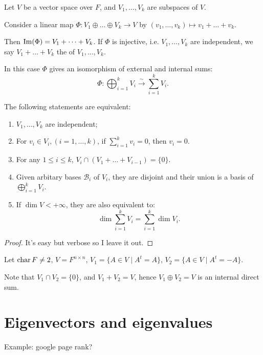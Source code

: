 \begin{remark}
    Let $V$ be a vector space over $F$, and $V_1,\dots,V_k$ are subspaces of $V$.

	Consider a linear map  $\Phi: V_1\oplus \dots\oplus V_k\to V$ by
	$(v_1,\dots,v_k)\mapsto v_1+\dots+v_k$.

	Then $\operatorname{Im}(\Phi) = V_1+\dots+V_k$.
	If $\Phi$ is injective, i.e.  $V_1,\dots,V_k$ are independent, we say
	$V_1+\dots+V_k$ the  of  $V_1,\dots,V_k$.

	In this case $\Phi$ gives an isomorphism of external and internal sums:
	\[
		\Phi: \bigoplus_{i=1}^k V_i \xrightarrow{\sim} \sum_{i=1}^k V_i.
	\]
\end{remark}

\begin{lemma}
	The following statements are equivalent:
	\begin{enumerate}
		\item $V_1,\dots, V_k$ are independent;
		\item For $v_i\in V_i, (i=1,\dots,k)$, if $\sum_{i=1}^kv_i =0$, then  $v_i=0$.
		\item For any  $1\le i\le k$,  $V_i\cap (V_1+\dots+V_{i-1})=\{0\}$.
		\item Given arbitary bases  $\mathcal{B}_i$ of $V_i$,
			they are disjoint and their union is a basis of $\bigoplus_{i=1}^k V_i$.
		\item If $\dim V<+\infty$, they are also equivalent to:
		\[
			\dim \sum_{i=1}^{k} V_i = \sum_{i=1}^{k} \dim V_i.
		\]
	\end{enumerate}
\end{lemma}
\begin{proof}[Proof]
    It's easy but verbose so I leave it out.
\end{proof}

\begin{example}
	Let $\operatorname{char} F \ne 2$,  $V=F^{n \times n}$, $V_1 = \{A\in V\mid A^t=A\}$,
	$V_2 = \{A\in V\mid A^t = -A\}$.

	Note that $V_1\cap V_2 = \{0\}$, and $V_1+V_2 = V$,
	hence $V_1\oplus V_2=V$ is an internal direct sum.
\end{example}

\section{Eigenvectors and eigenvalues}
\label{sec:Eigenvectors and eigenvalues}
Example: google page rank?

